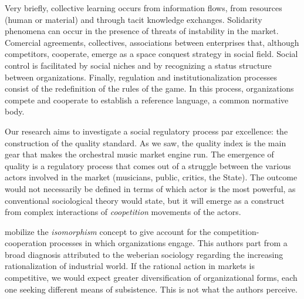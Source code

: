 \documentclass[a4paper, 12pt, openright, oneside, german, french, brazil, english, article]{abntex2}
\begin{document}
	Very briefly, collective learning occurs from information flows, from resources (human or material) and through tacit knowledge exchanges. Solidarity phenomena can occur in the presence of threats of instability in the market. Comercial agreements, collectives, associations between enterprises that, although competitors, cooperate, emerge as a space conquest strategy in social field. Social control is facilitated by social niches and by recognizing a status structure between organizations. Finally, regulation and institutionalization processes consist of the redefinition of the rules of the game. In this process, organizations compete and cooperate to establish a reference language, a common normative body.

        Our research aims to investigate a social regulatory process par excellence: the construction of the quality standard. As we saw, the quality index is the main gear that makes the orchestral music market engine run. The emergence of quality is a regulatory process that comes out of a struggle between the various actors involved in the market (musicians, public, critics, the State). The outcome would not necessarily be defined in terms of which actor is the most powerful, as conventional sociological theory would state, but it will emerge as a construct from complex interactions of \textit{coopetition} movements of the actors.
	
	
	 mobilize the \textit{isomorphism} concept to give account for the competition-cooperation processes in which organizations engage. This authors part from a broad diagnosis attributed to the weberian sociology regarding the increasing rationalization of industrial world. If the rational action in markets is competitive, we would expect greater diversification of organizational forms, each one seeking different means of subsistence. This is not what the authors perceive.
	
\end{document}
